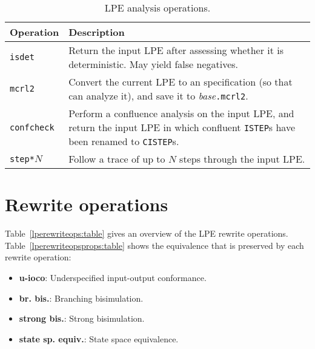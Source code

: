 \begin{table}[!ht]
\begin{center}
\begin{tabularx}{\linewidth}{l|X|}
\textbf{Operation} & \textbf{Description} \\ \hline
\texttt{isdet} & Return the input LPE after assessing whether it is deterministic. May yield false negatives. \\ \hline
\texttt{mcrl2} & Convert the current LPE to an \mcrl{} specification (so that \mcrl{} can analyze it), and save it to \textit{base}\texttt{.mcrl2}. \\ \hline
\texttt{confcheck} & Perform a confluence analysis on the input LPE, and return the input LPE in which confluent \texttt{ISTEP}s have been renamed to \texttt{CISTEP}s. \\ \hline
\texttt{step*}$N$ & Follow a trace of up to $N$ steps through the input LPE. \\ \hline
\end{tabularx}
\caption{LPE analysis operations.}
\label{lpeanalysisops:table}
\end{center}
\end{table}

\section{Rewrite operations}

Table~\ref{lperewriteops:table} gives an overview of the LPE rewrite operations.
Table~\ref{lperewriteopsprops:table} shows the equivalence that is preserved by each rewrite operation:
\begin{itemize}
\item \textbf{u-ioco}: Underspecified input-output conformance.
\item \textbf{br. bis.}: Branching bisimulation.
\item \textbf{strong bis.}: Strong bisimulation.
\item \textbf{state sp. equiv.}: State space equivalence.
\end{itemize}

